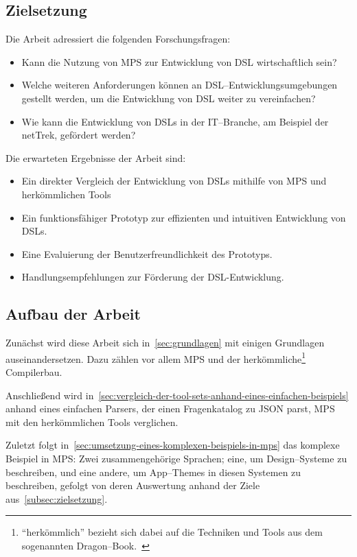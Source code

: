\subsection{Zielsetzung}\label{subsec:zielsetzung}
Die Arbeit adressiert die folgenden Forschungsfragen:
\begin{itemize}
    \item Kann die Nutzung von \ac{MPS} zur Entwicklung von \ac{DSL} wirtschaftlich sein?
    \item Welche weiteren Anforderungen können an \ac{DSL}--Entwicklungsumgebungen gestellt werden, um die Entwicklung von \ac{DSL} weiter zu vereinfachen?
    \item Wie kann die Entwicklung von \acp{DSL} in der \acs{IT}--Branche, am Beispiel der \ac{netTrek}, gefördert werden?
\end{itemize}
Die erwarteten Ergebnisse der Arbeit sind:
\begin{itemize}
    \item Ein direkter Vergleich der Entwicklung von \acp{DSL} mithilfe von \ac{MPS} und herkömmlichen Tools
    \item Ein funktionsfähiger Prototyp zur effizienten und intuitiven Entwicklung von \acp{DSL}.
    \item Eine Evaluierung der Benutzerfreundlichkeit des Prototyps.
    \item Handlungsempfehlungen zur Förderung der DSL-Entwicklung.
\end{itemize}

\subsection{Aufbau der Arbeit}\label{subsec:aufbau-der-arbeit}
Zunächst wird diese Arbeit sich in~\autoref{sec:grundlagen} mit einigen Grundlagen auseinandersetzen.
Dazu zählen vor allem \ac{MPS} und der herkömmliche\footnote{\enquote{herkömmlich} bezieht sich dabei auf die Techniken und Tools aus dem sogenannten Dragon--Book.~\autocite{aho-2006}} Compilerbau.

Anschließend wird in~\autoref{sec:vergleich-der-tool-sets-anhand-eines-einfachen-beispiels} anhand eines einfachen Parsers, der einen Fragenkatalog zu \ac{JSON} parst, \ac{MPS} mit den herkömmlichen Tools verglichen.

Zuletzt folgt in~\autoref{sec:umsetzung-eines-komplexen-beispiels-in-mps} das komplexe Beispiel in \ac{MPS}: Zwei zusammengehörige Sprachen; eine, um Design--Systeme zu beschreiben, und eine andere, um App--Themes in diesen Systemen zu beschreiben, gefolgt von deren Auswertung anhand der Ziele aus~\autoref{subsec:zielsetzung}.
